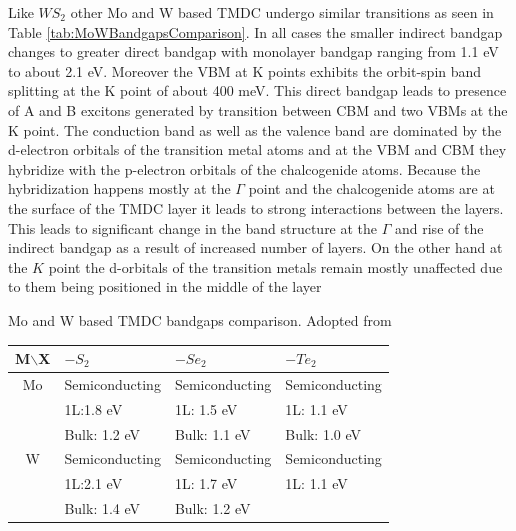Like $WS_2$ other Mo and W based TMDC undergo similar transitions as seen in Table \ref{tab:MoWBandgapsComparison}. In all cases the smaller indirect bandgap changes to greater direct bandgap with monolayer bandgap ranging from 1.1 eV to about 2.1 eV. Moreover the VBM at K points exhibits the orbit-spin band splitting at the K point of about 400 meV. This direct bandgap leads to presence of A and B excitons generated by transition between CBM and two VBMs at the K point. The conduction band as well as the valence band are dominated by the d-electron orbitals of the transition metal atoms and at the VBM and CBM they hybridize with the p-electron orbitals of the chalcogenide atoms. Because the hybridization happens mostly at the $\Gamma$ point and the chalcogenide atoms are at the surface of the TMDC layer it leads to strong interactions between the layers. This leads to significant change in the band structure at the $\Gamma$ and rise of the indirect bandgap as a result of increased number of layers. On the other hand at the $K$ point the d-orbitals of the transition metals remain mostly unaffected due to them being positioned in the middle of the layer \cite{WS2BandStructureSimulation} \cite{EmergingPhotoluminescenceInMonolayerMoS2}
	 
\begin{table}[H]
	\caption{Mo and W based TMDC bandgaps comparison. Adopted from \cite{ElectronicsAndOptoelectronicsOfTwo-dimensionalTransitionMetalDichalcogenides}}
	\label{tab:MoWBandgapsComparison}
\end{table}
	 
\begin{center}
	\begin{tabular}{c|l|l|l}
	 
	 M$\backslash$X & $-S_2$ 			& $-Se_2$ 			& $-Te_2$			\\ \hline
	 Mo 			& Semiconducting	& Semiconducting	& Semiconducting	\\ 
	 				& 1L:1.8 eV			& 1L: 1.5 eV		& 1L: 1.1 eV		\\
	 				& Bulk: 1.2 eV		& Bulk: 1.1 eV		& Bulk: 1.0 eV		\\ \hline
	 W 				& Semiconducting	& Semiconducting	& Semiconducting	\\
	 				& 1L:2.1 eV			& 1L: 1.7 eV		& 1L: 1.1 eV		\\
	 				& Bulk: 1.4 eV		& Bulk: 1.2 eV		& 					\\
	 
	\end{tabular}
\end{center}
	
